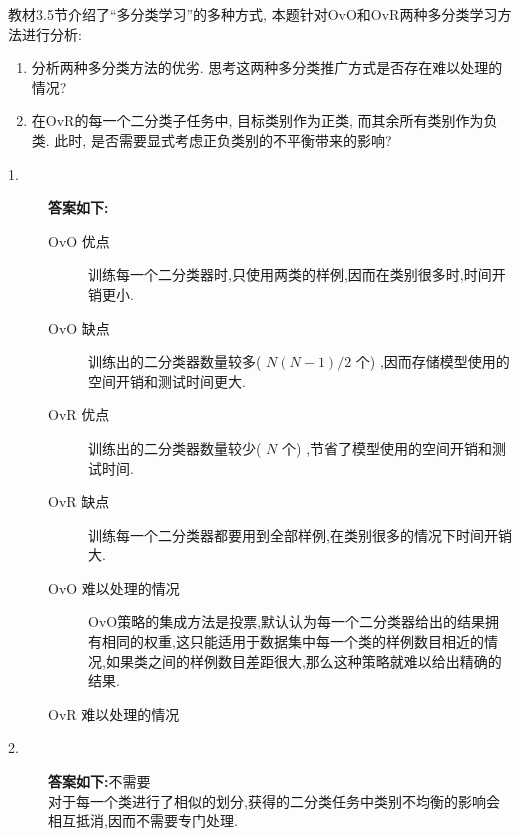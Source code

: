 \documentclass[answers]{exam}  %
\begin{document}
\begin{questions}
	教材3.5节介绍了“多分类学习”的多种方式, 本题针对OvO和OvR两种多分类学习方法进行分析:
	\begin{enumerate}
		\item 分析两种多分类方法的优劣. 思考这两种多分类推广方式是否存在难以处理的情况?
		\item 在OvR的每一个二分类子任务中, 目标类别作为正类, 而其余所有类别作为负类. 此时, 是否需要显式考虑正负类别的不平衡带来的影响?
	\end{enumerate}
	\begin{solution}
		\begin{description}
			\item[1.] \textbf{答案如下:}
			      \begin{description}
				      \item[OvO 优点]训练每一个二分类器时,只使用两类的样例,因而在类别很多时,时间开销更小.
				      \item[OvO 缺点]训练出的二分类器数量较多( $N(N-1)/2$ 个) ,因而存储模型使用的空间开销和测试时间更大.
				      \item[OvR 优点]训练出的二分类器数量较少( $N$ 个) ,节省了模型使用的空间开销和测试时间.
				      \item[OvR 缺点]训练每一个二分类器都要用到全部样例,在类别很多的情况下时间开销大.
				      \item[OvO 难以处理的情况] OvO策略的集成方法是投票,默认认为每一个二分类器给出的结果拥有相同的权重,这只能适用于数据集中每一个类的样例数目相近的情况,如果类之间的样例数目差距很大,那么这种策略就难以给出精确的结果.
				      \item[OvR 难以处理的情况]

			      \end{description}

			\item[2.] \textbf{答案如下:}不需要\\
			      对于每一个类进行了相似的划分,获得的二分类任务中类别不均衡的影响会相互抵消,因而不需要专门处理.
		\end{description}
	\end{solution}

\end{questions}
\end{document}
